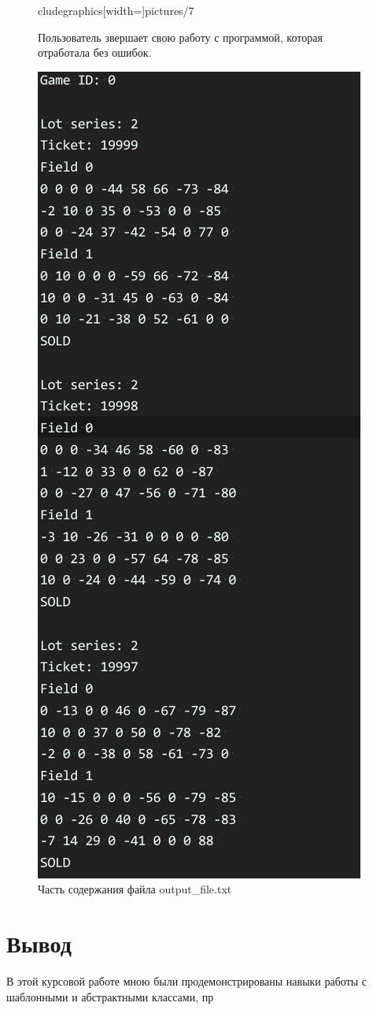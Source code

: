 \documentclass[a4paper,14pt]{article}
\begin{document}
\begin{figure}
cludegraphics[width=\linewidth]{pictures/7}
  \caption{Пользователь звершает свою работу с программой, которая отработала без ошибок.}
\end{figure}
\begin{figure}[H]
  \includegraphics[width=\linewidth]{pictures/8}
  \caption{Часть содержания файла output\_file.txt}
\end{figure}
\clearpage

\section{Вывод}
В этой курсовой работе мною были продемонстрированы навыки работы с шаблонными и абстрактными классами, пр
\end{document}

